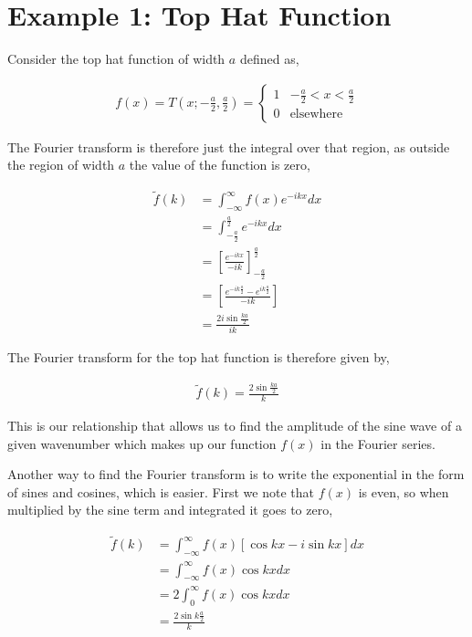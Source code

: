 \documentclass[11pt]{amsart}
\begin{document}
\section{Example 1: Top Hat Function}

Consider the top hat function of width $a$ defined as,

\begin{align*}
  f(x) = T\left(x; -\frac{a}{2}, \frac{a}{2}\right) =
  \begin{cases}
    1 & -\frac{a}{2} < x < \frac{a}{2} \\
    0 & \text{elsewhere}
  \end{cases}
\end{align*}

The Fourier transform is therefore just the integral over that region, as outside the region of width $a$ the value of the function is zero,

\begin{align*}
  \tilde{f}(k) &= \int_{-\infty}^{\infty}f(x)e^{-ikx} dx \\
               &= \int_{-\frac{a}{2}}^{\frac{a}{2}}e^{-ikx} dx \\
               &= {\left[\frac{e^{-ikx}}{-ik}\right]}_{-\frac{a}{2}}^{\frac{a}{2}} \\
               &= \left[\frac{e^{-ik\frac{a}{2}}-e^{ik\frac{a}{2}}}{-ik}\right] \\
               &= \frac{2i\sin{\frac{ka}{2}}}{ik}
\end{align*}

The Fourier transform for the top hat function is therefore given by,

\begin{align*}
  \tilde{f}(k) = \frac{2\sin{\frac{ka}{2}}}{k}
\end{align*}

This is our relationship that allows us to find the amplitude of the sine wave of a given wavenumber which makes up our function $f(x)$ in the Fourier series.

Another way to find the Fourier transform is to write the exponential in the form of sines and cosines, which is easier. First we note that $f(x)$ is even, so when multiplied by the sine term and integrated it goes to zero,

\begin{align*}
  \tilde{f}(k) &= \int_{-\infty}^{\infty} f(x) \left[\cos{kx}-i\sin{kx}\right] dx \\
               &= \int_{-\infty}^{\infty} f(x) \cos{kx} dx \\
               &= 2 \int_0^{\infty} f(x) \cos{kx} dx \\
               &= \frac{2\sin{k\frac{a}{2}}}{k}
\end{align*}
\end{document}
